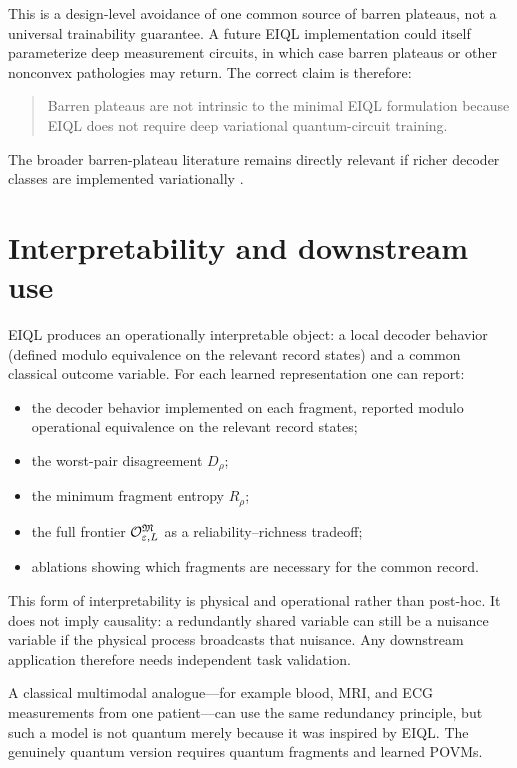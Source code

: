 This is a design-level avoidance of one common source of barren plateaus, not a universal trainability guarantee. A future EIQL implementation could itself parameterize deep measurement circuits, in which case barren plateaus or other nonconvex pathologies may return. The correct claim is therefore:

\begin{quote}
Barren plateaus are not intrinsic to the minimal EIQL formulation because EIQL does not require deep variational quantum-circuit training.
\end{quote}

The broader barren-plateau literature remains directly relevant if richer decoder classes are implemented variationally \cite{mcclean2018,larocca2024}.

\section{Interpretability and downstream use}

EIQL produces an operationally interpretable object: a local decoder behavior (defined modulo equivalence on the relevant record states) and a common classical outcome variable. For each learned representation one can report:

\begin{itemize}
\item the decoder behavior implemented on each fragment, reported modulo operational equivalence on the relevant record states;
\item the worst-pair disagreement $D_\rho$;
\item the minimum fragment entropy $R_\rho$;
\item the full frontier $\mathcal O_{\varepsilon,L}^{\mathfrak M}$ as a reliability--richness tradeoff;
\item ablations showing which fragments are necessary for the common record.
\end{itemize}

This form of interpretability is physical and operational rather than post-hoc. It does not imply causality: a redundantly shared variable can still be a nuisance variable if the physical process broadcasts that nuisance. Any downstream application therefore needs independent task validation.

A classical multimodal analogue---for example blood, MRI, and ECG measurements from one patient---can use the same redundancy principle, but such a model is not quantum merely because it was inspired by EIQL. The genuinely quantum version requires quantum fragments and learned POVMs.

